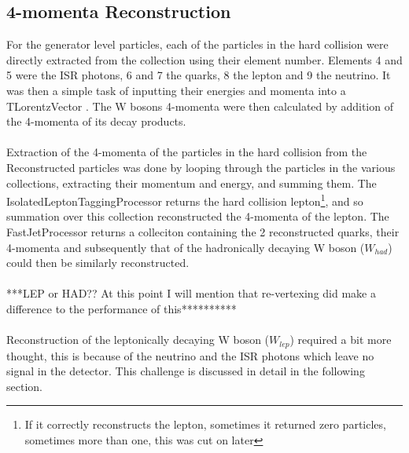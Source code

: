 \subsection{4-momenta Reconstruction}
\label{SUBSEC:4momentaReconstruction}
For the generator level particles, each of the particles in the hard collision were directly extracted from the collection using their element number. Elements 4 and 5 were the ISR photons, 6 and 7 the quarks, 8 the lepton and 9 the neutrino. It was then a simple task of inputting their energies and momenta into a TLorentzVector \cite{TLorentzVector}. The W bosons 4-momenta were then calculated by addition of the 4-momenta of its decay products.
\\\\
Extraction of the 4-momenta of the particles in the hard collision from the Reconstructed particles was done by looping through the particles in the various collections, extracting their momentum and energy, and summing them. The IsolatedLeptonTaggingProcessor \cite{IsolatedLeptonTaggingProcessor} returns the hard collision lepton\footnote{If it correctly reconstructs the lepton, sometimes it returned zero particles, sometimes more than one, this was cut on later}, and so summation over this collection reconstructed the 4-momenta of the lepton. The FastJetProcessor returns a colleciton containing the 2 reconstructed quarks, their 4-momenta and subsequently that of the hadronically decaying W boson (${W}_{had}$) could then be similarly reconstructed.
\\\\
***LEP or HAD?? At this point I will mention that re-vertexing did make a difference to the performance of this**********
\\\\
Reconstruction of the leptonically decaying W boson (${W}_{lep}$) required a bit more thought, this is because of the neutrino and the ISR photons which leave no signal in the detector. This challenge is discussed in detail in the following section.

